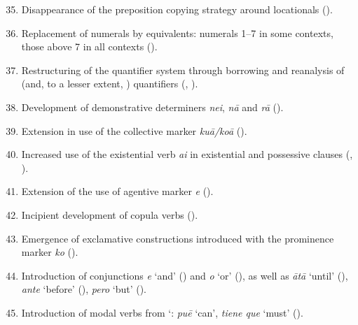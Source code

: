 \begin{enumerate}
\setcounter{enumi}{34}
\item 
Disappearance of the preposition copying strategy around locationals ().

\item 
Replacement of numerals by  equivalents: numerals 1–7 in some contexts, those above 7 in all contexts ().

\item 
Restructuring of the quantifier system through borrowing and reanalysis of  (and, to a lesser extent, ) quantifiers (, ).

\item 
Development of demonstrative determiners \textit{nei}, \textit{nā} and \textit{rā} ().

\item 
Extension in use of the collective marker \textit{ku}\textit{ā}\textit{/koā} ().

\item 
Increased use of the existential verb \textit{ai} in existential and possessive clauses (, ).

\item 
Extension of the use of agentive marker \textit{e} ().

\item 
Incipient development of copula verbs ().

\item 
Emergence of exclamative constructions introduced with the prominence marker \textit{ko} ().

\item 
Introduction of conjunctions \textit{{\ꞌ}e} ‘and’ () and \textit{{\ꞌ}o} ‘or’ (), as well as \textit{{\ꞌ}ātā} ‘until’ (), \textit{ante} ‘before’ (), \textit{pero} ‘but’ ().

\item 
Introduction of modal verbs from `: \textit{pu}\textit{ē} ‘can’, \textit{tiene que} ‘must’ ().

\end{enumerate}
